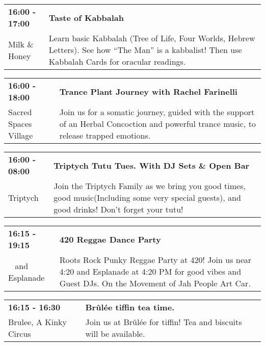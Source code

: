 \begin{tabular}{ p{1in} p{2.2in} }
    \textbf{16:00 - 17:00} & \textbf{Taste of Kabbalah} \\
    Milk \& Honey \newline  & Learn basic Kabbalah (Tree of Life, Four Worlds, Hebrew Letters). See how ``The Man'' is a kabbalist! Then use Kabbalah Cards for oracular readings. \\
    \hline 
\end{tabular}
    
\begin{tabular}{ p{1in} p{2.2in} }
    \textbf{16:00 - 18:00} & \textbf{Trance Plant Journey with Rachel Farinelli} \\
    Sacred Spaces Village \newline  & Join us for a somatic journey, guided with the support of an Herbal Concoction and powerful trance music, to release trapped emotions. \\
    \hline 
\end{tabular}
    
\begin{tabular}{ p{1in} p{2.2in} }
    \textbf{16:00 - 08:00} & \textbf{Triptych Tutu Tues. With DJ Sets \& Open Bar} \\
    Triptych \newline  & Join the Triptych Family as we bring you good times, good music(Including some very special guests), and good drinks! Don't forget your tutu! \\
    \hline 
\end{tabular}
    
\begin{tabular}{ p{1in} p{2.2in} }
    \textbf{16:15 - 19:15} & \textbf{420 Reggae Dance Party} \\
    ~ \newline 420 and Esplanade  & Roots Rock Punky Reggae Party at 420! Join us near 4:20 and Esplanade at 4:20 PM for good vibes and Guest DJs. On the Movement of Jah People Art Car. \\
    \hline 
\end{tabular}
    
\begin{tabular}{ p{1in} p{2.2in} }
    \textbf{16:15 - 16:30} & \textbf{Br\^ul\'ee tiffin tea time.} \\
    Brulee, A Kinky Circus \newline  & Join us at Br\^ul\'ee for tiffin! Tea and biscuits will be available. \\
    \hline 
\end{tabular}
    
